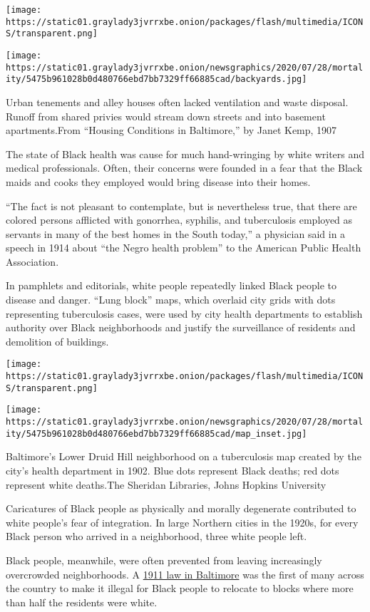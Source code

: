 \texttt{[image: https://static01.graylady3jvrrxbe.onion/packages/flash/multimedia/ICONS/transparent.png]}

\texttt{[image: https://static01.graylady3jvrrxbe.onion/newsgraphics/2020/07/28/mortality/5475b961028b0d480766ebd7bb7329ff66885cad/backyards.jpg]}

Urban tenements and alley houses often lacked ventilation and waste
disposal. Runoff from shared privies would stream down streets and into
basement apartments.From ``Housing Conditions in Baltimore,'' by Janet
Kemp, 1907

The state of Black health was cause for much hand-wringing by white
writers and medical professionals. Often, their concerns were founded in
a fear that the Black maids and cooks they employed would bring disease
into their homes.

``The fact is not pleasant to contemplate, but is nevertheless true,
that there are colored persons afflicted with gonorrhea, syphilis, and
tuberculosis employed as servants in many of the best homes in the South
today,'' a physician said in a speech in 1914 about ``the Negro health
problem'' to the American Public Health Association.

In pamphlets and editorials, white people repeatedly linked Black people
to disease and danger. ``Lung block'' maps, which overlaid city grids
with dots representing tuberculosis cases, were used by city health
departments to establish authority over Black neighborhoods and justify
the surveillance of residents and demolition of buildings.

\texttt{[image: https://static01.graylady3jvrrxbe.onion/packages/flash/multimedia/ICONS/transparent.png]}

\texttt{[image: https://static01.graylady3jvrrxbe.onion/newsgraphics/2020/07/28/mortality/5475b961028b0d480766ebd7bb7329ff66885cad/map\_inset.jpg]}

Baltimore's Lower Druid Hill neighborhood on a tuberculosis map created
by the city's health department in 1902. Blue dots represent Black
deaths; red dots represent white deaths.The Sheridan Libraries, Johns
Hopkins University

Caricatures of Black people as physically and morally degenerate
contributed to white people's fear of integration. In large Northern
cities in the 1920s, for every Black person who arrived in a
neighborhood, three white people left.

Black people, meanwhile, were often prevented from leaving increasingly
overcrowded neighborhoods. A
\href{https://digitalcommons.law.umaryland.edu/cgi/viewcontent.cgi?article=2498\&context=mlr}{1911
law in Baltimore} was the first of many across the country to make it
illegal for Black people to relocate to blocks where more than half the
residents were white.

